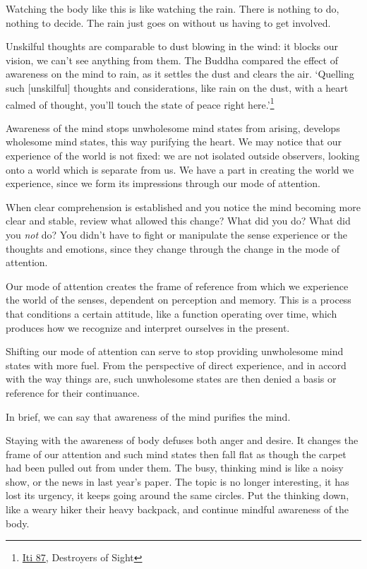 \enlargethispage*{\baselineskip}

Watching the body like this is like watching the rain. There is nothing
to do, nothing to decide. The rain just goes on without us having to get
involved.

\clearpage


Unskilful thoughts are comparable to dust blowing in the wind: it blocks
our vision, we can't see anything from them. The Buddha compared the
effect of awareness on the mind to rain, as it settles the dust and
clears the air. `Quelling such {[}unskilful{]} thoughts and
considerations, like rain on the dust, with a heart calmed of thought,
you'll touch the state of peace right here.'\footnote{\href{https://suttacentral.net/iti87/en/sujato}{Iti
  87}, Destroyers of Sight}

Awareness of the mind stops unwholesome mind states from arising,
develops wholesome mind states, this way purifying the heart. We may
notice that our experience of the world is not fixed: we are not
isolated outside observers, looking onto a world which is separate from
us. We have a part in creating the world we experience, since we form
its impressions through our mode of attention.

When clear comprehension is established and you notice the mind becoming
more clear and stable, review what allowed this change? What did you do?
What did you \emph{not} do? You didn't have to fight or manipulate the
sense experience or the thoughts and emotions, since they change through
the change in the mode of attention.

Our mode of attention creates the frame of reference from which we
experience the world of the senses, dependent on perception and memory.
This is a process that conditions a certain attitude, like a function
operating over time, which produces how we recognize and interpret
ourselves in the present.

\clearpage

Shifting our mode of attention can serve to stop providing unwholesome
mind states with more fuel. From the perspective of direct experience,
and in accord with the way things are, such unwholesome states are then
denied a basis or reference for their continuance.

In brief, we can say that awareness of the mind purifies the mind.

Staying with the awareness of body defuses both anger and desire. It
changes the frame of our attention and such mind states then fall flat
as though the carpet had been pulled out from under them. The busy,
thinking mind is like a noisy show, or the news in last year's paper.
The topic is no longer interesting, it has lost its urgency, it keeps
going around the same circles. Put the thinking down, like a weary hiker
their heavy backpack, and continue mindful awareness of the body.

